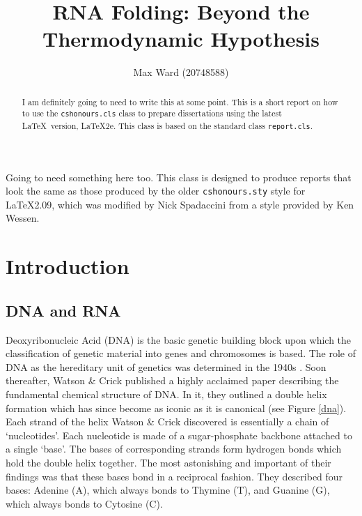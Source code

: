 \documentclass{cshonours}
\title{RNA Folding: Beyond the Thermodynamic Hypothesis}
\author{Max Ward (20748588)}
\begin{document}
\maketitle

\begin{abstract}
I am definitely going to need to write this at some point. This is a short report on how to use the {\tt cshonours.cls} class
to prepare dissertations using the latest \LaTeX\ version,
\LaTeX2e. This class is based on the standard class {\tt report.cls}.
\end{abstract}

\begin{acknowledgements}
Going to need something here too.
This class is designed to produce reports that look
the same as those produced by the older {\tt cshonours.sty} style for
\LaTeX 2.09, which was modified by Nick Spadaccini from a style
provided by Ken Wessen.
\end{acknowledgements}

\tableofcontents
\listoftables  %
\listoffigures  %



\chapter{Introduction}
\section{DNA and RNA}
Deoxyribonucleic Acid (DNA) is the basic genetic building block upon which the classification of genetic material into genes and chromosomes is based. The role of DNA as the hereditary unit of genetics was determined in the 1940s \cite{albertsessential}. Soon thereafter, Watson \& Crick \cite{watson1953molecular} published a highly acclaimed paper describing the fundamental chemical structure of DNA. In it, they outlined a double helix formation which has since become as iconic as it is canonical (see Figure \ref{dna}). Each strand of the helix Watson \& Crick discovered is essentially a chain of `nucleotides'. Each nucleotide is made of a sugar-phosphate backbone attached to a single `base'. The bases of corresponding strands form hydrogen bonds which hold the double helix together. The most astonishing and important of their findings was that these bases bond in a reciprocal fashion. They described four bases: Adenine (A), which always bonds to Thymine (T), and Guanine (G), which always bonds to Cytosine (C).
\end{document}
